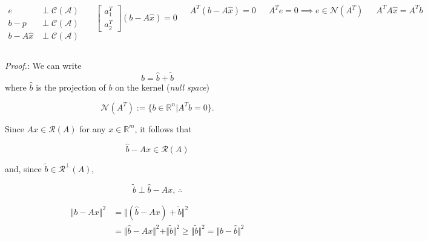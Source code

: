 \documentclass[aspectratio=169]{beamer}
\newcommand{\incfig}[2][1]{%
    \def\svgwidth{#1\columnwidth}
    {#2.pdf_tex} }
\begin{document}
\begin{frame} %
	\begin{columns}
	
	\begin{align*}
		e &\perp \mathcal{C(A)} \\
		b- p & \perp \mathcal{C(A)} \\
		b- A \hat{x} & \perp \mathcal{C(A)}
	\end{align*}
	
	\begin{equation*}
		\begin{bmatrix} a_1^T \\ a_2^T\end{bmatrix} \left(b - A \hat{x} \right) = 0
	\end{equation*}

	\begin{equation*}
		A^T \left(b - A \hat{x} \right) = 0
	\end{equation*}
	
	\begin{equation*}	
		A^T e = 0 \implies e \in \mathcal{N}(A^T)
	\end{equation*}	

	\begin{equation*}
		A^T A \hat{x} = A^T b
	\end{equation*}


\begin{figure}[ht]
    \centering
    \incfig{mainissue}
    \label{fig:minhatx}
\end{figure}

	\end{columns}
\end{frame}

\begin{frame}{}  %
	
	{\color{violet} \textit{Proof.}:} We can write
		\[ b = \hat{b} + \tilde{b} \]
		\noindent where $\hat{b}$ is the projection of $b$ on the kernel (\textit{null space})
		
		\[\mathcal{N}(A^T) := \{ b\in \mathbb{R}^n | A^T b = 0  \}. \]
		
		Since $Ax \in \mathcal{R}(A) $ for any $x \in \mathbb{R}^m$, it follows that
		
		\[ \hat{b} - Ax \in \mathcal{R}(A) \]
		
		\noindent and, since $\tilde{b} \in \mathcal{R^\perp}(A)$,
		
		\[ \tilde{b} \perp  \hat{b} - Ax, \, \therefore  \]
		

		\begin{align*}
		\Vert b- Ax \Vert^2 &= \Vert (\hat{b}- Ax) + \tilde{b} \Vert^2\\
		&=\Vert \hat{b}- Ax  \Vert^2 + \Vert \tilde{b} \Vert^2 \geq \Vert \tilde{b} \Vert^2 = \Vert b - \hat{b} \Vert^2
		\end{align*}
\end{frame}
\end{document}
